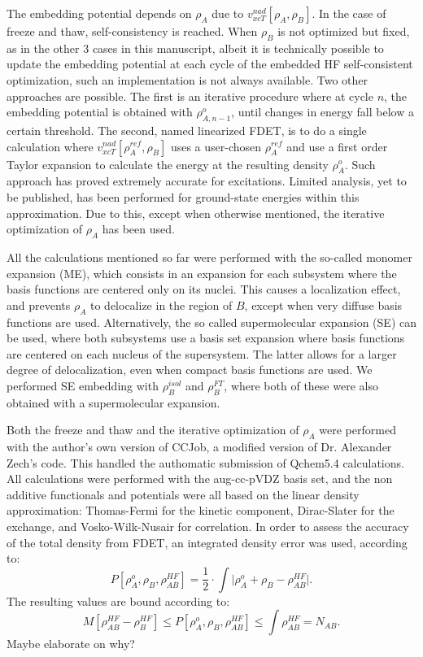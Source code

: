 \documentclass[journal=jctcce,manuscript=article, layout=twocolumn]{achemso}
\newcommand{\nr}[1]{\color{red}#1\color{black}}
\begin{document}
The embedding potential depends on $\rho_A$ due to $v_{xcT}^{nad}[\rho_A, \rho_B]$. In the case of freeze and thaw, self-consistency is reached. When $\rho_B$ is not optimized but fixed, as in the other 3 cases in this manuscript, albeit it is technically possible to update the embedding potential at each cycle of the embedded HF self-consistent optimization\cite{Dulak2009}, such an implementation is not always available. Two other approaches are possible.  The first is an iterative procedure where at cycle $n$, the embedding potential is obtained with $\rho^{o}_{A,n-1}$, until changes in energy fall below a certain threshold. The second, named linearized FDET, is to do a single calculation where $v_{xcT}^{nad}[\rho^{ref}_A, \rho_B]$ uses a user-chosen $\rho^{ref}_A$ and use a first order Taylor expansion to calculate the energy at the resulting density $\rho^{o}_A$. Such approach has proved extremely accurate for excitations\cite{Zech2015}. Limited analysis, yet to be published, has been performed for ground-state energies within this approximation. Due to this, except when otherwise mentioned, the iterative optimization of $\rho_A$ has been used.

All the calculations mentioned so far were performed with the so-called monomer expansion (ME), which consists in an expansion for each subsystem where the basis functions are centered only on its nuclei. This causes a localization effect, and prevents $\rho_A$ to delocalize in the region of $B$, except when very diffuse basis functions are used.
Alternatively, the so called supermolecular expansion (SE) can be used, where both subsystems use a basis set expansion where basis functions are centered on each nucleus of the supersystem. The latter allows for a larger degree of delocalization, even when compact basis functions are used. We performed SE embedding with $\rho_B^{isol}$ and $\rho_B^{FT}$, where both of these were also obtained with a supermolecular expansion.

Both the freeze and thaw and the iterative optimization of $\rho_A$ were performed with the author's own version of CCJob\cite{CCJob_Ricardi}, a modified version of Dr. Alexander Zech's code\cite{CCJob_Zech}. This handled the authomatic submission of Qchem5.4\cite{Qchem54} calculations. 
All calculations were performed with the aug-cc-pVDZ basis set, and the non additive functionals and potentials were all based on the linear density approximation: Thomas-Fermi\cite{Thomas1927, Fermi1928} for the kinetic component, Dirac-Slater\cite{Slater1929} for the exchange, and Vosko-Wilk-Nusair\cite{Vosko1980} for correlation.
In order to assess the accuracy of the total density from FDET, an integrated density error was used, according to:
\begin{equation}
 P[\rho^{o}_A, \rho_B, \rho^{HF}_{AB}] = \frac{1}{2} \cdot \int \vert \rho^{o}_A + \rho_B - \rho^{HF}_{AB} \vert .
\end{equation}
The resulting values are bound according to:
\begin{equation} \label{eq:P_bound}
 M[\rho^{HF}_{AB} - \rho^{HF}_{B}] \leq P[\rho^{o}_A, \rho_B, \rho^{HF}_{AB}] \leq \int \rho^{HF}_{AB} = N_{AB}.
\end{equation}
\nr{Maybe elaborate on why?}
\end{document}
